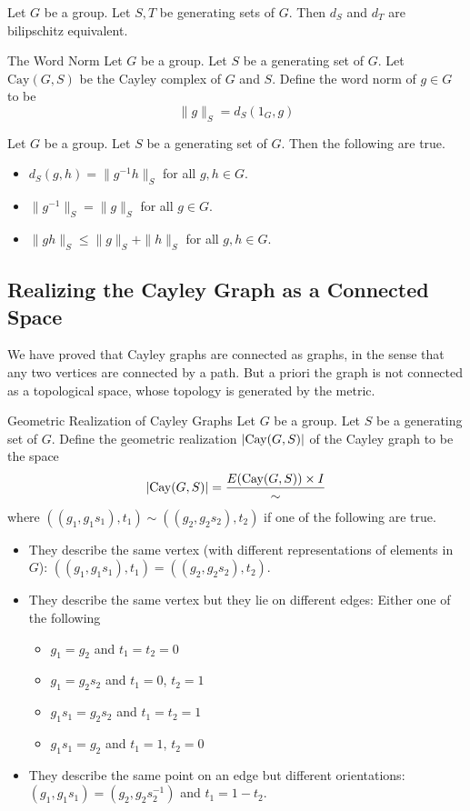 \documentclass[a4paper]{article}
\begin{document}
\begin{lmm}{}{} Let $G$ be a group. Let $S,T$ be generating sets of $G$. Then $d_S$ and $d_T$ are bilipschitz equivalent. 
\end{lmm}

\begin{defn}{The Word Norm}{} Let $G$ be a group. Let $S$ be a generating set of $G$. Let $\text{Cay}(G,S)$ be the Cayley complex of $G$ and $S$. Define the word norm of $g\in G$ to be $$\|g\|_S=d_S(1_G,g)$$
\end{defn}

\begin{lmm}{}{} Let $G$ be a group. Let $S$ be a generating set of $G$. Then the following are true. 
\begin{itemize}
\item $d_S(g,h)=\|g^{-1}h\|_S$ for all $g,h\in G$. 
\item $\|g^{-1}\|_S=\|g\|_S$ for all $g\in G$. 
\item $\|gh\|_S\leq\|g\|_S+\|h\|_S$ for all $g,h\in G$. 
\end{itemize}
\end{lmm}

\subsection{Realizing the Cayley Graph as a Connected Space}
We have proved that Cayley graphs are connected as graphs, in the sense that any two vertices are connected by a path. But a priori the graph is not connected as a topological space, whose topology is generated by the metric. 

\begin{defn}{Geometric Realization of Cayley Graphs}{} Let $G$ be a group. Let $S$ be a generating set of $G$. Define the geometric realization $\abs{\text{Cay}(G,S)}$ of the Cayley graph to be the space $$\abs{\text{Cay}(G,S)}=\frac{E(\text{Cay}(G,S))\times I}{\sim}$$ where $((g_1,g_1s_1),t_1)\sim((g_2,g_2s_2),t_2)$ if one of the following are true. 
\begin{itemize}
\item They describe the same vertex (with different representations of elements in $G$): $((g_1,g_1s_1),t_1)=((g_2,g_2s_2),t_2)$. 
\item They describe the same vertex but they lie on different edges: Either one of the following
\begin{itemize}
\item $g_1=g_2$ and $t_1=t_2=0$
\item $g_1=g_2s_2$ and $t_1=0$, $t_2=1$
\item $g_1s_1=g_2s_2$ and $t_1=t_2=1$
\item $g_1s_1=g_2$ and $t_1=1$, $t_2=0$
\end{itemize}
\item They describe the same point on an edge but different orientations: $(g_1,g_1s_1)=(g_2,g_2s_2^{-1})$ and $t_1=1-t_2$. 
\end{itemize}
\end{defn}
\end{document}
